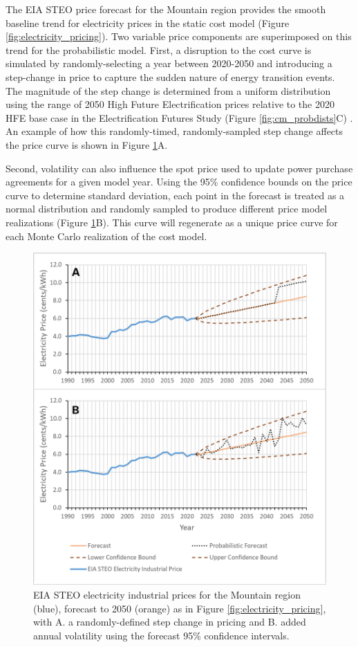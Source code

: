 The EIA STEO price forecast for the Mountain region \citep{eia_short-term_2021} provides the smooth baseline trend for electricity prices in the static cost model (Figure \ref{fig:electricity_pricing}). Two variable price components are superimposed on this trend for the probabilistic model. First, a disruption to the cost curve is simulated by randomly-selecting a year between 2020-2050 and introducing a step-change in price to capture the sudden nature of energy transition events. The magnitude of the step change is determined from a uniform distribution using the range of 2050 High Future Electrification prices relative to the 2020 HFE base case in the Electrification Futures Study (Figure \ref{fig:cm_probdists}C) \citep{murphy_electrification_2021}. An example of how this randomly-timed, randomly-sampled step change affects the price curve is shown in Figure \ref{fig:elec_price_prob}A. 

Second, volatility can also influence the spot price used to update power purchase agreements for a given model year. Using the 95\% confidence bounds on the price curve to determine standard deviation, each point in the forecast is treated as a normal distribution and randomly sampled to produce different price model realizations (Figure \ref{fig:elec_price_prob}B). This curve will regenerate as a unique price curve for each Monte Carlo realization of the cost model.

\begin{figure}[htp]
\centering
\includegraphics[width=.85\textwidth]{templates/images/Figure-ElectPrice_Prob.png}
\singlespacing
\caption[Cost model probabilistic electricity pricing]{EIA STEO electricity industrial prices for the Mountain region (blue), forecast to 2050 (orange) as in Figure \ref{fig:electricity_pricing}, with A. a randomly-defined step change in pricing and B. added annual volatility using the forecast 95\% confidence intervals.}
\label{fig:elec_price_prob}
\end{figure}

